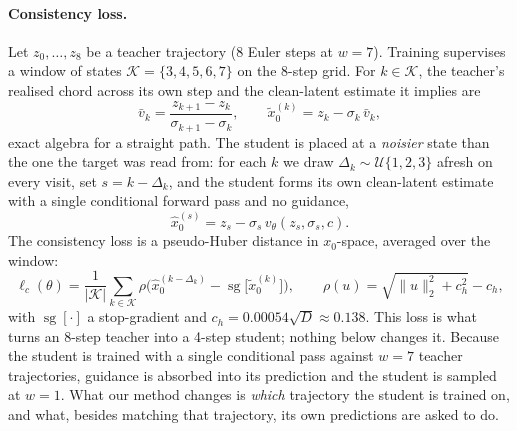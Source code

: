 \documentclass{article} %
\DeclareMathOperator{\sgop}{sg}
\begin{document}
\paragraph{Consistency loss.} Let $z_0,\dots,z_8$ be a teacher trajectory (8 Euler steps at $w{=}7$).
Training supervises a window of states $\mathcal K=\{3,4,5,6,7\}$ on the 8-step grid. For $k\in\mathcal K$,
the teacher's realised chord across its own step and the clean-latent estimate it implies are
\begin{equation}
\bar v_k=\frac{z_{k+1}-z_k}{\sigma_{k+1}-\sigma_k},\qquad
\tilde x_0^{(k)}=z_k-\sigma_k\,\bar v_k ,
\end{equation}
exact algebra for a straight path. The student is placed at a \emph{noisier} state than the one the target
was read from: for each $k$ we draw $\Delta_k\sim\mathcal U\{1,2,3\}$ afresh on every visit, set
$s=k-\Delta_k$, and the student forms its own clean-latent estimate with a single conditional forward
pass and no guidance,
\begin{equation}
\hat x_0^{(s)}=z_s-\sigma_s\,v_\theta(z_s,\sigma_s,c).
\end{equation}
The consistency loss is a pseudo-Huber distance in $x_0$-space, averaged over the window:
\begin{equation}
\ell_c(\theta)=\frac{1}{|\mathcal K|}\sum_{k\in\mathcal K}\rho\Big(\hat x_0^{(k-\Delta_k)}-\sgop\big[\tilde x_0^{(k)}\big]\Big),
\qquad \rho(u)=\sqrt{\lVert u\rVert_2^2+c_h^2}-c_h ,
\label{eq:cdloss}
\end{equation}
with $\sgop[\cdot]$ a stop-gradient and $c_h=0.00054\sqrt D\approx0.138$. This loss is what turns an
8-step teacher into a 4-step student; nothing below changes it. Because the student is trained with a
single conditional pass against $w{=}7$ teacher trajectories, guidance is absorbed into its prediction and
the student is sampled at $w{=}1$. What our method changes is \emph{which} trajectory the student is
trained on, and what, besides matching that trajectory, its own predictions are asked to do.
\end{document}
